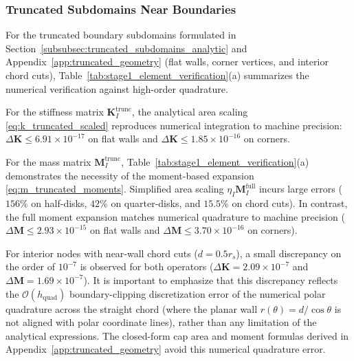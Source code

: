 \documentclass[VANCOUVER,Times1COL]{WileyNJD-v5}
\begin{document}
\subsubsection{Truncated Subdomains Near Boundaries}
For the truncated boundary subdomains formulated in Section~\ref{subsubsec:truncated_subdomains_analytic} and Appendix~\ref{app:truncated_geometry} (flat walls, corner vertices, and interior chord cuts), Table~\ref{tab:stage1_element_verification}(a) summarizes the numerical verification against high-order quadrature.

For the stiffness matrix $\mathbf{K}_I^{\mathrm{trunc}}$, the analytical area scaling \eqref{eq:k_truncated_scaled} reproduces numerical integration to machine precision: $\Delta \mathbf{K} \le 6.91 \times 10^{-17}$ on flat walls and $\Delta \mathbf{K} \le 1.85 \times 10^{-16}$ on corners.

For the mass matrix $\mathbf{M}_I^{\mathrm{trunc}}$, Table~\ref{tab:stage1_element_verification}(a) demonstrates the necessity of the moment-based expansion \eqref{eq:m_truncated_moments}. Simplified area scaling $\eta_I \mathbf{M}_I^{\mathrm{full}}$ incurs large errors ($156\%$ on half-disks, $42\%$ on quarter-disks, and $15.5\%$ on chord cuts). In contrast, the full moment expansion matches numerical quadrature to machine precision ($\Delta \mathbf{M} \le 2.93 \times 10^{-15}$ on flat walls and $\Delta \mathbf{M} \le 3.70 \times 10^{-16}$ on corners).

For interior nodes with near-wall chord cuts ($d = 0.5 r_s$), a small discrepancy on the order of $10^{-7}$ is observed for both operators ($\Delta \mathbf{K} = 2.09 \times 10^{-7}$ and $\Delta \mathbf{M} = 1.69 \times 10^{-7}$). It is important to emphasize that this discrepancy reflects the $\mathcal{O}(h_{\mathrm{quad}})$ boundary-clipping discretization error of the numerical polar quadrature across the straight chord (where the planar wall $r(\theta) = d/\cos\theta$ is not aligned with polar coordinate lines), rather than any limitation of the analytical expressions. The closed-form cap area and moment formulas derived in Appendix~\ref{app:truncated_geometry} avoid this numerical quadrature error.
\end{document}
